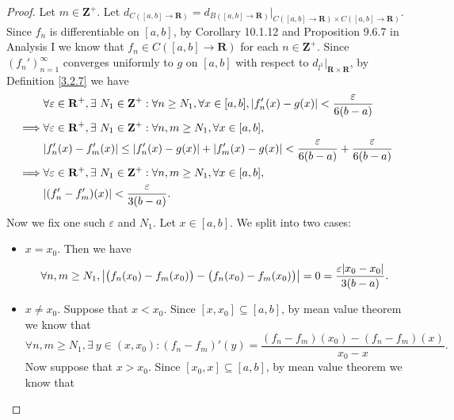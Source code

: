 \begin{proof}
    Let \(m \in \mathbf{Z}^+\).
    Let \(d_{C([a, b] \to \mathbf{R})} = d_{B([a, b] \to \mathbf{R})}|_{C([a, b] \to \mathbf{R}) \times C([a, b] \to \mathbf{R})}\).
    Since \(f_n\) is differentiable on \([a, b]\), by Corollary 10.1.12 and Proposition 9.6.7 in Analysis I we know that \(f_n \in C([a, b] \to \mathbf{R})\) for each \(n \in \mathbf{Z}^+\).
    Since \((f_n')_{n = 1}^\infty\) converges uniformly to \(g\) on \([a, b]\) with respect to \(d_{l^1}|_{\mathbf{R} \times \mathbf{R}}\), by Definition \ref{3.2.7} we have
    \begin{align*}
                 & \forall \varepsilon \in \mathbf{R}^+, \exists\ N_1 \in \mathbf{Z}^+ : \forall n \geq N_1, \forall x \in [a, b], \abs*{f_n'(x) - g(x)} < \frac{\varepsilon}{6(b - a)} \\
        \implies & \forall \varepsilon \in \mathbf{R}^+, \exists\ N_1 \in \mathbf{Z}^+ : \forall n, m \geq N_1, \forall x \in [a, b],                                                   \\
                 & \abs*{f_n'(x) - f_m'(x)} \leq \abs*{f_n'(x) - g(x)} + \abs*{f_m'(x) - g(x)} < \frac{\varepsilon}{6(b - a)} + \frac{\varepsilon}{6(b - a)}                            \\
        \implies & \forall \varepsilon \in \mathbf{R}^+, \exists\ N_1 \in \mathbf{Z}^+ : \forall n, m \geq N_1, \forall x \in [a, b],                                                   \\
                 & \abs*{(f_n' - f_m')(x)} < \frac{\varepsilon}{3(b - a)}.
    \end{align*}
    Now we fix one such \(\varepsilon\) and \(N_1\).
    Let \(x \in [a, b]\).
    We split into two cases:
    \begin{itemize}
        \item \(x = x_0\).
              Then we have
              \[
                  \forall n, m \geq N_1, \abs*{\big(f_n(x_0) - f_m(x_0)\big) - \big(f_n(x_0) - f_m(x_0)\big)} = 0 = \frac{\varepsilon \abs*{x_0 - x_0}}{3(b - a)}.
              \]
        \item \(x \neq x_0\).
              Suppose that \(x < x_0\).
              Since \([x, x_0] \subseteq [a, b]\), by mean value theorem we know that
              \[
                  \forall n, m \geq N_1, \exists\ y \in (x, x_0) : (f_n - f_m)'(y) = \frac{(f_n - f_m)(x_0) - (f_n - f_m)(x)}{x_0 - x}.
              \]
              Now suppose that \(x > x_0\).
              Since \([x_0, x] \subseteq [a, b]\), by mean value theorem we know that

\end{itemize}
\end{proof}
